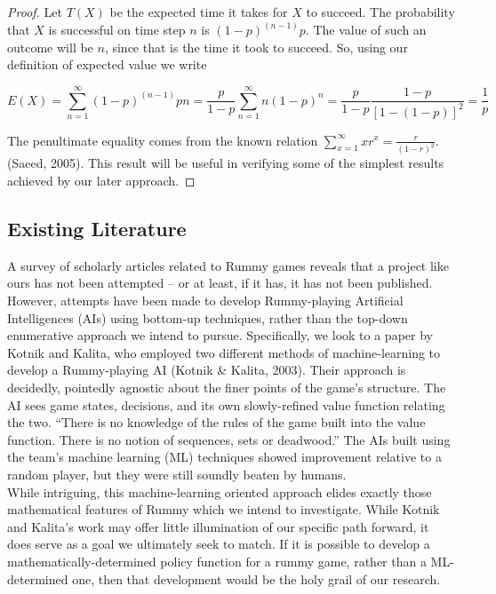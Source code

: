 \documentclass[letter,12pt]{article}
\begin{document}
\begin{proof}
Let $T(X)$  be the expected time it takes for $X$ to succeed. The probability that $X$ is successful on time step $n$ is $(1−p)^(n-1) p$. The value of such an outcome will be $n$, since that is the time it took to succeed. So, using our definition of expected value we write 

$$E(X) = \sum_{n=1}^{\infty} (1-p)^{(n-1)} p n = \frac{p}{1-p} \sum_{n=1}^{\infty} n (1-p)^n =
	\frac{p}{1-p} \frac{1-p}{[1-(1-p)]^2} = \frac{1}{p} $$

The penultimate equality comes from the known relation $\sum_{x=1}^{\infty} x r^x = \frac{r}{(1-r)^2}$. (Saeed, 2005). This result will be useful in verifying some of the simplest results achieved by our later approach.

\end{proof}

\subsection{Existing Literature}

 A survey of scholarly articles related to Rummy games reveals that a project like ours has not been attempted – or at least, if it has, it has not been published. However, attempts have been made to develop Rummy-playing Artificial Intelligences (AIs) using bottom-up techniques, rather than the top-down enumerative approach we intend to pursue. Specifically, we look to a paper by Kotnik and Kalita, who employed two different methods of machine-learning to develop a Rummy-playing AI (Kotnik \& Kalita, 2003). Their approach is decidedly, pointedly agnostic about the finer points of the game’s structure. The AI sees game states, decisions, and its own slowly-refined value function relating the two. “There is no knowledge of the rules of the game built into the value function. There is no notion of sequences, sets or deadwood.” The AIs built using the team’s machine learning (ML) techniques showed improvement relative to a random player, but they were still soundly beaten by humans. \\

While intriguing, this machine-learning oriented approach elides exactly those mathematical features of Rummy which we intend to investigate. While Kotnik and Kalita’s work may offer little illumination of our specific path forward, it does serve as a goal we ultimately seek to match. If it is possible to develop a mathematically-determined policy function for a rummy game, rather than a ML-determined one, then that development would be the holy grail of our research.  
 
\end{document}
